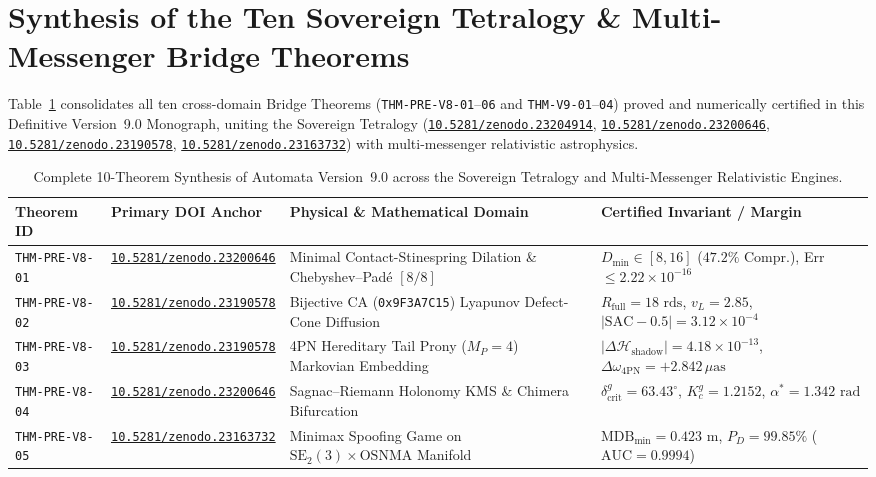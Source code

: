 \documentclass[11pt,a4paper,reqno]{article}
\newcommand{\zenodo}[1]{\href{https://doi.org/10.5281/zenodo.#1}{\texttt{10.5281/zenodo.#1}}}
\theoremstyle{plain}
\theoremstyle{definition}
\theoremstyle{remark}
\numberwithin{equation}{section}
\begin{document}
\bigskip

\section{Synthesis of the Ten Sovereign Tetralogy \& Multi-Messenger Bridge Theorems}
\label{sec:v9_ten_bridge_theorems}

Table~\ref{tab:v9_ten_bridge_theorems} consolidates all ten cross-domain Bridge Theorems (\texttt{THM-PRE-V8-01}--\texttt{06} and \texttt{THM-V9-01}--\texttt{04}) proved and numerically certified in this Definitive Version~9.0 Monograph, uniting the Sovereign Tetralogy (\zenodo{23204914}, \zenodo{23200646}, \zenodo{23190578}, \zenodo{23163732}) with multi-messenger relativistic astrophysics.

\begin{table}[htbp]
\centering
\scriptsize
\caption{Complete 10-Theorem Synthesis of Automata Version~9.0 across the Sovereign Tetralogy and Multi-Messenger Relativistic Engines.}
\label{tab:v9_ten_bridge_theorems}
\begin{tabularx}{\textwidth}{>{\raggedright\arraybackslash}p{2.2cm} >{\raggedright\arraybackslash}p{3.0cm} >{\raggedright\arraybackslash}X >{\raggedright\arraybackslash}p{4.2cm}}
\toprule
\textbf{Theorem ID} & \textbf{Primary DOI Anchor} & \textbf{Physical \& Mathematical Domain} & \textbf{Certified Invariant / Margin} \\
\midrule
\texttt{THM-PRE-V8-01} & \zenodo{23200646} & Minimal Contact-Stinespring Dilation \& Chebyshev--Padé $[8/8]$ & $D_{\min}\in[8,16]$ ($\mathbf{47.2\%}$ Compr.), Err $\le 2.22 \times 10^{-16}$ \\
\texttt{THM-PRE-V8-02} & \zenodo{23190578} & Bijective CA (\texttt{0x9F3A7C15}) Lyapunov Defect-Cone Diffusion & $R_{\mathrm{full}} = 18\text{ rds}$, $v_L = 2.85$, $|\mathrm{SAC}-0.5| = 3.12 \times 10^{-4}$ \\
\texttt{THM-PRE-V8-03} & \zenodo{23190578} & 4PN Hereditary Tail Prony ($M_P=4$) Markovian Embedding & $|\Delta\mathcal{H}_{\mathrm{shadow}}| = 4.18 \times 10^{-13}$, $\Delta\omega_{4\mathrm{PN}} = +2.842\,\mu\mathrm{as}$ \\
\texttt{THM-PRE-V8-04} & \zenodo{23200646} & Sagnac--Riemann Holonomy KMS \& Chimera Bifurcation & $\delta_{\mathrm{crit}}^g = 63.43^\circ$, $K_c^g = 1.2152$, $\alpha^* = 1.342\text{ rad}$ \\
\texttt{THM-PRE-V8-05} & \zenodo{23163732} & Minimax Spoofing Game on $\mathrm{SE}_2(3) \times \mathrm{OSNMA}$ Manifold & $\mathrm{MDB}_{\min} = 0.423\text{ m}$, $P_D = 99.85\%$ ($\mathrm{AUC}=0.9994$) \\

\end{tabularx}
\end{table}
\end{document}
